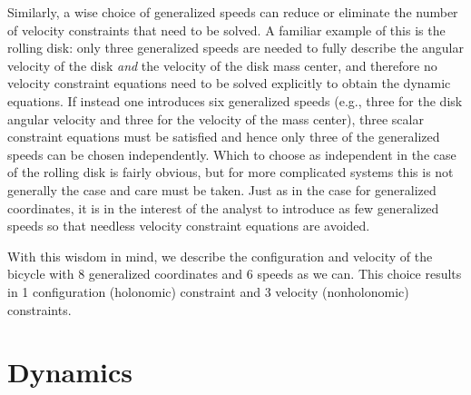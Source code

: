 Similarly, a wise choice of generalized speeds can reduce or eliminate the
number of velocity constraints that need to be solved. A familiar example of
this is the rolling disk: only three generalized speeds are needed to fully
describe the angular velocity of the disk \textit{and} the velocity of the disk
mass center, and therefore no velocity constraint equations need to be solved
explicitly to obtain the dynamic equations. If instead one introduces six
generalized speeds (e.g., three for the disk angular velocity and three for the
velocity of the mass center), three scalar constraint equations must be
satisfied and hence only three of the generalized speeds can be chosen
independently. Which to choose as independent in the case of the rolling disk
is fairly obvious, but for more complicated systems this is not generally the
case and care must be taken\cite{Reckdahl1996}. Just as in the case for
generalized coordinates, it is in the interest of the analyst to introduce as
few generalized speeds so that needless velocity constraint equations are
avoided.

With this wisdom in mind, we describe the configuration and velocity of the
bicycle with 8 generalized coordinates and 6 speeds as we can. This choice
results in 1 configuration (holonomic) constraint and 3 velocity (nonholonomic)
constraints.


\section{Dynamics}

